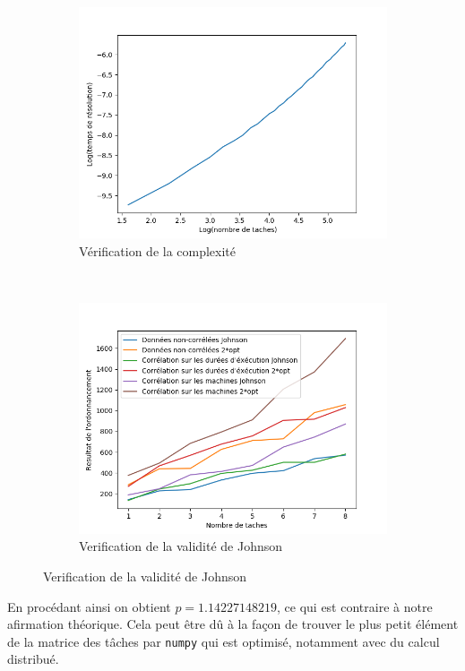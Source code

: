 \documentclass[a4paper, 10pt]{article}
\begin{document}
       	\begin{figure}[H]
			\centering
			\begin{subfigure}[b]{0.49\linewidth}
				\includegraphics[width=1\linewidth]{graphes/verification_Johnson.png}
				\caption{Vérification de la complexité}
				\label{fig:verifComp}
			\end{subfigure}
			~
			\begin{subfigure}[b]{0.49\linewidth}
				\includegraphics[width=1\linewidth]{graphes/validite_Johnson.png}
				\caption{Verification de la validité de Johnson}
				\label{fig:validiteJ}
			\end{subfigure}
		\end{figure}
                En procédant ainsi on obtient $p = 1.14227148219$, ce qui est contraire à notre afirmation théorique. Cela peut être dû à la façon de trouver le plus petit élément de la matrice des tâches par \texttt{numpy} qui est optimisé, notamment avec du calcul distribué.
		
\end{document}
